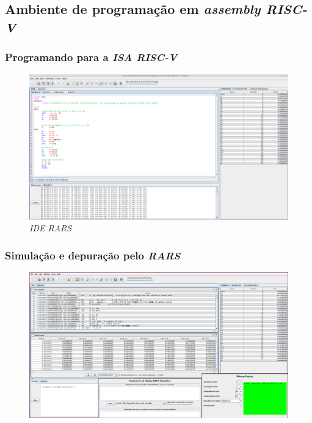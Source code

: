 \documentclass[aspectratio=169]{beamer}
\begin{document}
    \subsection{Ambiente de programação em \textit{assembly RISC-V}}
    \begin{frame}
        \frametitle{Programando para a \textit{ISA RISC-V}}
        \vfill
        \begin{figure}[H]
        \centering
            \includegraphics[width=.9\textwidth,height=.85\textheight,keepaspectratio]{../images/rars.png}
            \caption{\textit{IDE RARS}}
        \end{figure}
        \vfill
    \end{frame}

    \begin{frame}
        \frametitle{Simulação e depuração pelo \textit{RARS}}
        \vfill
        \begin{figure}[H]
        \centering
            \includegraphics[width=.9\textwidth,height=.85\textheight,keepaspectratio]{../images/rars_debug.png}
        \end{figure}
        \vfill
    \end{frame}
\end{document}
